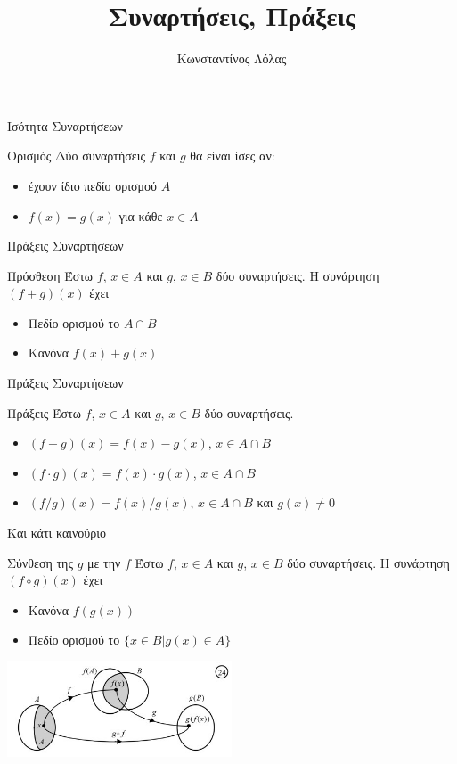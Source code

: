 \documentclass[greek]{beamer}
\title{Συναρτήσεις, Πράξεις}
\author[Λόλας]{Κωνσταντίνος Λόλας}
\date{}
\begin{document}
\begin{frame}
 \titlepage
\end{frame}
\begin{frame}{Ισότητα Συναρτήσεων}
 \begin{block}{Ορισμός}
  Δύο συναρτήσεις $f$ και $g$ θα είναι ίσες αν:
  \begin{itemize}
   \item έχουν ίδιο πεδίο ορισμού $Α$
   \item $f(x)=g(x)$ για κάθε $x\in Α$
  \end{itemize}
 \end{block}
\end{frame}

\begin{frame}{Πράξεις Συναρτήσεων}
 \begin{block}{Πρόσθεση}
  Έστω $f$, $x\in Α$ και $g$, $x\in Β$ δύο συναρτήσεις. Η συνάρτηση $(f+g)(x)$ έχει
  \begin{itemize}
   \item Πεδίο ορισμού το $A\cap Β$
   \item Κανόνα $f(x)+g(x)$
  \end{itemize}
 \end{block}
\end{frame}

\begin{frame}{Πράξεις Συναρτήσεων}
 \begin{block}{Πράξεις}
  Έστω $f$, $x\in Α$ και $g$, $x\in Β$ δύο συναρτήσεις.
  \begin{itemize}
   \item $(f-g)(x)=f(x)-g(x)$, $x\in A\cap Β$
   \item $(f\cdot g)(x)=f(x)\cdot g(x)$, $x\in A\cap Β$
   \item $(f/g)(x)=f(x)/g(x)$, $x\in A\cap Β$ και $g(x)\ne 0$
  \end{itemize}
 \end{block}
\end{frame}

\begin{frame}{Και κάτι καινούριο}
 \begin{block}{Σύνθεση της $g$ με την $f$}
  Έστω $f$, $x\in Α$ και $g$, $x\in Β$ δύο συναρτήσεις. Η συνάρτηση $(f\circ g)(x)$ έχει
  \begin{itemize}
   \item Κανόνα $f(g(x))$
   \item Πεδίο ορισμού το $\{x\in Β | g(x)\in Α \}$
  \end{itemize}
 \end{block}
 \centering
 \includegraphics[width=0.5\textwidth]{"images/1.2 Σύνθεση.png"}
\end{frame}
\end{document}
